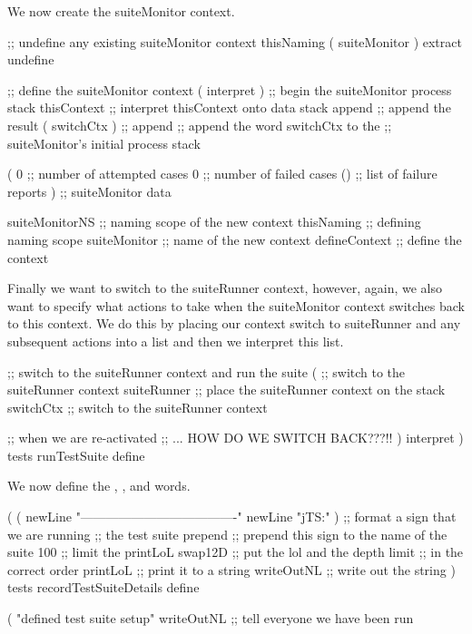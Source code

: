 We now create the suiteMonitor context.

\startJoylolCode
  ;; undefine any existing suiteMonitor context
  thisNaming
  ( suiteMonitor ) extract
  undefine

  ;; define the suiteMonitor context
  ( interpret )   ;; begin the suiteMonitor process stack
  thisContext     ;; interpret thisContext onto data stack
  append          ;; append the result
  ( switchCtx )   ;;
  append          ;; append the word switchCtx to the 
                  ;; suiteMonitor's initial process stack
  
  (
    0             ;; number of attempted cases
    0             ;; number of failed cases
    ()            ;; list of failure reports
  )               ;; suiteMonitor data
  
  suiteMonitorNS  ;; naming scope of the new context
  thisNaming      ;; defining naming scope
  suiteMonitor    ;; name of the new context
  defineContext   ;; define the context
\stopJoylolCode

Finally we want to switch to the suiteRunner context, however, again, we 
also want to specify what actions to take when the suiteMonitor context 
switches back to this context. We do this by placing our context switch to 
suiteRunner and any subsequent actions into a list and then we interpret 
this list. 

\startJoylolCode
  ;; switch to the suiteRunner context and run the suite
  (
    ;; switch to the suiteRunner context
    suiteRunner ;; place the suiteRunner context on the stack
    switchCtx   ;; switch to the suiteRunner context
    
    ;; when we are re-activated
    ;; ... HOW DO WE SWITCH BACK???!!
  )
  interpret
)
tests
runTestSuite
define
\stopJoylolCode

We now define the , 
, and  words. 

\startJoylolCode
(
  (
    newLine
    "-------------------------------------"
    newLine
    "jTS:"
  )           ;; format a sign that we are running
              ;; the test suite
  prepend     ;; prepend this sign to the name of the suite
  100         ;; limit the printLoL
  swap12D     ;; put the lol and the depth limit 
              ;; in the correct order
  printLoL    ;; print it to a string
  writeOutNL  ;; write out the string
)
tests
recordTestSuiteDetails
define
\stopJoylolCode

\startJoylolCode
(
  "defined test suite setup"
  writeOutNL  ;; tell everyone we have been run

